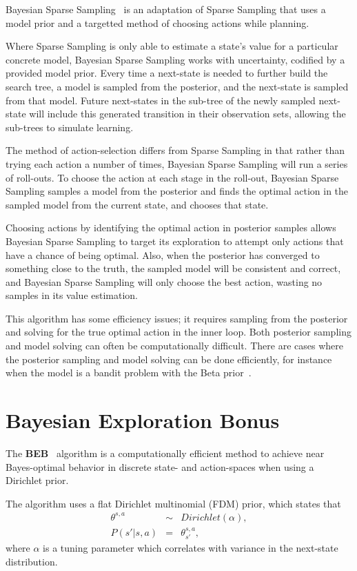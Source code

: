 Bayesian Sparse Sampling~\cite{wang05} is an adaptation of Sparse Sampling that uses a model prior and a targetted method of choosing actions while planning.

Where Sparse Sampling is only able to estimate a state's value for a particular concrete model, Bayesian Sparse Sampling works with uncertainty, codified by a provided model prior. Every time a next-state is needed to further build the search tree, a model is sampled from the posterior, and the next-state is sampled from that model. Future next-states in the sub-tree of the newly sampled next-state will include this generated transition in their observation sets, allowing the sub-trees to simulate learning.

The method of action-selection differs from Sparse Sampling in that rather than trying each action a number of times, Bayesian Sparse Sampling will run a series of roll-outs. To choose the action at each stage in the roll-out, Bayesian Sparse Sampling samples a model from the posterior and finds the optimal action in the sampled model from the current state, and chooses that state.

Choosing actions by identifying the optimal action in posterior samples allows Bayesian Sparse Sampling to target its exploration to attempt only actions that have a chance of being optimal. Also, when the posterior has converged to something close to the truth, the sampled model will be consistent and correct, and Bayesian Sparse Sampling will only choose the best action, wasting no samples in its value estimation.

This algorithm has some efficiency issues; it requires sampling from the posterior and solving for the true optimal action in the inner loop. Both posterior sampling and model solving can often be computationally difficult. There are cases where the posterior sampling and model solving can be done efficiently, for instance when the model is a bandit problem with the Beta prior~\cite{wang05}.



\section{Bayesian Exploration Bonus}

The {\bf BEB}~\cite{kolter09} algorithm is a computationally efficient method to achieve near Bayes-optimal behavior in discrete state- and action-spaces when using a Dirichlet prior.

The algorithm uses a flat Dirichlet multinomial (FDM) prior, which states that
\begin{eqnarray}
\theta^{s,a}&\sim&Dirichlet(\alpha),\\
P(s'|s,a)&=&\theta^{s,a}_{s'},
\end{eqnarray}
where $\alpha$ is a tuning parameter which correlates with variance in the next-state distribution.

